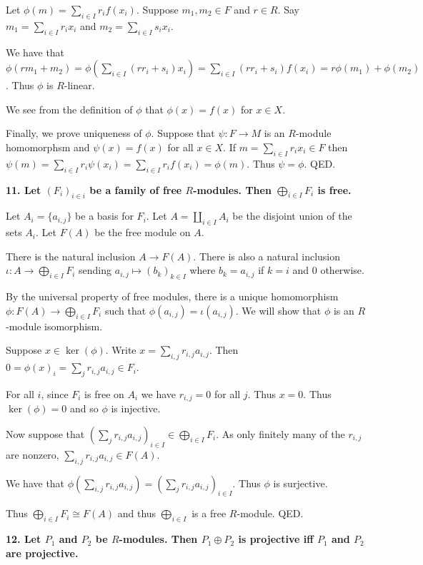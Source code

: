 \documentclass[12pt]{article}
\begin{document}
Let $\phi(m) = \sum_{i\in I} r_if(x_i)$. Suppose $m_1, m_2 \in F$ and $r \in R$. Say $m_1 = \sum_{i\in I}r_ix_i$ and $m_2 = \sum_{i\in I}s_ix_i$.

We have that $\phi(rm_1 + m_2) = \phi\left(\sum_{i\in I} (rr_i + s_i)x_i\right) = \sum_{i\in I}(rr_i + s_i)f(x_i) = r\phi(m_1) + \phi(m_2)$. Thus $\phi$ is $R$-linear.

We see from the definition of $\phi$ that $\phi(x) = f(x)$ for $x \in X$.

Finally, we prove uniqueness of $\phi$. Suppose that $\psi : F \to M$ is an $R$-module homomorphsm and $\psi(x) = f(x)$ for all $x \in X$. If $m = \sum_{i\in I}r_ix_i \in F$ then $\psi(m) = \sum_{i\in I}r_i\psi(x_i) = \sum_{i\in I}r_if(x_i) = \phi(m)$. Thus $\psi = \phi$. QED.

\textbf{11. Let $(F_i)_{i\in i}$ be a family of free $R$-modules. Then $\bigoplus_{i\in I} F_i$ is free.}

Let $A_i = \{a_{i,j}\}$ be a basis for $F_i$. Let $A = \coprod_{i \in I} A_i$ be the disjoint union of the sets $A_i$. Let $F(A)$ be the free module on $A$.

There is the natural inclusion $A \to F(A)$. There is also a natural inclusion $\iota : A \to \bigoplus_{i\in I} F_i$ sending $a_{i,j} \mapsto (b_k)_{k\in I}$ where $b_k = a_{i,j}$ if $k = i$ and $0$ otherwise.

By the universal property of free modules, there is a unique homomorphism $\phi : F(A) \to \bigoplus_{i\in I} F_i$ such that $\phi(a_{i,j}) = \iota(a_{i,j})$. We will show that $\phi$ is an $R$-module isomorphism.

Suppose $x \in \ker(\phi)$. Write $x = \sum_{i,j} r_{i,j}a_{i,j}$. Then $0 = \phi(x)_i = \sum_j r_{i,j}a_{i,j} \in F_i$.

For all $i$, since $F_i$ is free on $A_i$ we have $r_{i,j} = 0$ for all $j$. Thus $x = 0$. Thus $\ker(\phi) = 0$ and so $\phi$ is injective.

Now suppose that $\left(\sum_j r_{i,j}a_{i,j}\right)_{i\in I} \in \bigoplus_{i\in I}F_i$. As only finitely many of the $r_{i,j}$ are nonzero, $\sum_{i,j} r_{i,j}a_{i,j} \in F(A)$.

We have that $\phi\left(\sum_{i,j} r_{i,j}a_{i,j}\right) = \left(\sum_j r_{i,j}a_{i,j}\right)_{i\in I}$. Thus $\phi$ is surjective.

Thus $\bigoplus_{i\in I} F_i \cong F(A)$ and thus $\bigoplus_{i\in I}$ is a free $R$-module. QED.

\textbf{12. Let $P_1$ and $P_2$ be $R$-modules. Then $P_1\oplus P_2$ is projective iff $P_1$ and $P_2$ are projective.}
\end{document}

